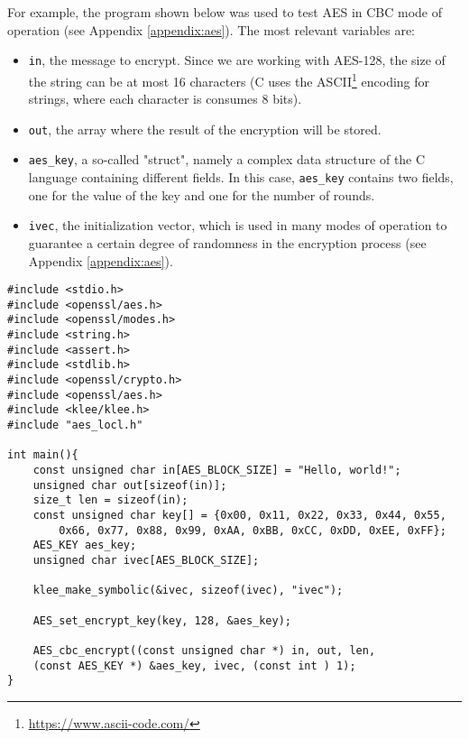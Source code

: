 \documentclass[12pt,a4paper]{book}
\theoremstyle{definition}
\begin{document}
	For example, the program shown below was used to test AES in CBC mode of operation (see Appendix \ref{appendix:aes}). The most relevant variables are:
	\begin{itemize}
		\item \texttt{in}, the message to encrypt. Since we are working with AES-128, the size of the string can be at most 16 characters (C uses the ASCII\footnote{\url{https://www.ascii-code.com/}} encoding for strings, where each character is consumes 8 bits).
		\item \texttt{out}, the array where the result of the encryption will be stored.
		\item \texttt{aes\_key}, a so-called "struct", namely a complex data structure of the C language containing different fields. In this case, \texttt{aes\_key} contains two fields, one for the value of the key and one for the number of rounds.
		\item \texttt{ivec}, the initialization vector, which is used in many modes of operation to guarantee a certain degree of randomness in the encryption process (see Appendix \ref{appendix:aes}).
	\end{itemize}
	\begin{lstlisting}[caption=\texttt{testing\_AES\_CBC.c}, label=test-aes-cbc]
#include <stdio.h>
#include <openssl/aes.h>
#include <openssl/modes.h>
#include <string.h>
#include <assert.h>
#include <stdlib.h>
#include <openssl/crypto.h>
#include <openssl/aes.h>
#include <klee/klee.h>
#include "aes_locl.h"

int main(){
	const unsigned char in[AES_BLOCK_SIZE] = "Hello, world!";
	unsigned char out[sizeof(in)];
	size_t len = sizeof(in);
	const unsigned char key[] = {0x00, 0x11, 0x22, 0x33, 0x44, 0x55,
		0x66, 0x77, 0x88, 0x99, 0xAA, 0xBB, 0xCC, 0xDD, 0xEE, 0xFF};
	AES_KEY aes_key;
	unsigned char ivec[AES_BLOCK_SIZE];	
	
	klee_make_symbolic(&ivec, sizeof(ivec), "ivec");
	
	AES_set_encrypt_key(key, 128, &aes_key);
	
	AES_cbc_encrypt((const unsigned char *) in, out, len, 
	(const AES_KEY *) &aes_key, ivec, (const int ) 1);
}
	\end{lstlisting}
	\vspace{3mm}
	
\end{document}

